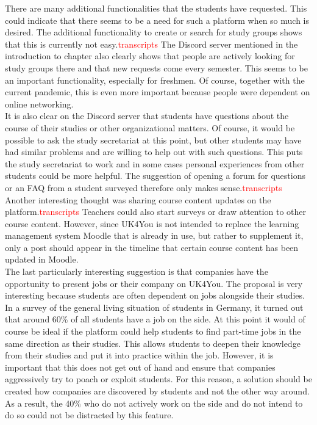 There are many additional functionalities that the students have requested.
This could indicate that there seems to be a need for such a platform when so much is desired.
The additional functionality to create or search for study groups shows that this is currently not easy.\textcolor{red}{transcripts}
The Discord server mentioned in the introduction to chapter also clearly shows that people are actively looking for study groups there and that new requests come every semester.
This seems to be an important functionality, especially for freshmen.
Of course, together with the current pandemic, this is even more important because people were dependent on online networking.\\

It is also clear on the Discord server that students have questions about the course of their studies or other organizational matters.
Of course, it would be possible to ask the study secretariat at this point, but other students may have had similar problems and are willing to help out with such questions.
This puts the study secretariat to work and in some cases personal experiences from other students could be more helpful.
The suggestion of opening a forum for questions or an FAQ from a student surveyed therefore only makes sense.\textcolor{red}{transcripts}
Another interesting thought was sharing course content updates on the platform.\textcolor{red}{transcripts}
Teachers could also start surveys or draw attention to other course content.
However, since UK4You is not intended to replace the learning management system Moodle that is already in use, but rather to supplement it, only a post should appear in the timeline that certain course content has been updated in Moodle.\\

The last particularly interesting suggestion is that companies have the opportunity to present jobs or their company on UK4You.
The proposal is very interesting because students are often dependent on jobs alongside their studies.
In a survey of the general living situation of students in Germany, it turned out that around 60\% of all students have a job on the side\cite{students-work}.
At this point it would of course be ideal if the platform could help students to find part-time jobs in the same direction as their studies.
This allows students to deepen their knowledge from their studies and put it into practice within the job.
However, it is important that this does not get out of hand and ensure that companies aggressively try to poach or exploit students.
For this reason, a solution should be created how companies are discovered by students and not the other way around.
As a result, the 40\% who do not actively work on the side and do not intend to do so could not be distracted by this feature.\\

